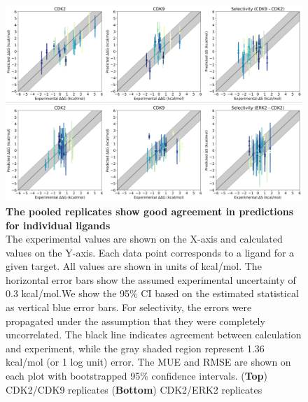 \documentclass[phd,tocprelim]{cornell}
\begin{document}
\begin{appendices}
	\begin{landscape}
		\begin{figure}[p]
			\centering
			\includegraphics[width=0.7\linewidth]{figures/supp_figure8.pdf}
			\caption[The pooled replicates show good agreement in predictions for individual ligands]{
				{\bf The pooled replicates show good agreement in predictions for individual ligands} \\
				The experimental values are shown on the X-axis and calculated values on the Y-axis. Each data point corresponds to a ligand for a given target. All values are shown in units of kcal/mol. The horizontal error bars show the assumed experimental uncertainty of 0.3 kcal/mol\citep{BROWN2009420}.We show the 95\% CI based on the estimated statistical as vertical blue error bars. For selectivity, the errors were propagated under the assumption that they were completely uncorrelated. The black line indicates agreement between calculation and experiment, while the gray shaded region represent 1.36 kcal/mol (or 1 log unit) error. The MUE and RMSE are shown on each plot with bootstrapped 95$\%$ confidence intervals. ({\bf Top}) CDK2/CDK9 replicates ({\bf Bottom}) CDK2/ERK2 replicates
			}
			\label{fig:sup-figure-8}
		\end{figure}
	\end{landscape}
	

\end{appendices}
\end{document}
